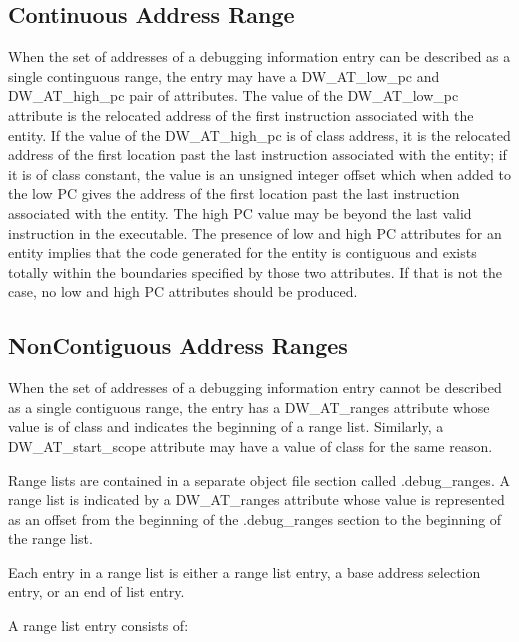 \subsection{Continuous Address Range}
\label{chap:contiguousaddressranges}
When the set of addresses of a debugging information entry can
be described as a single continguous range, the entry may have
a DW\-\_AT\-\_low\-\_pc and DW\-\_AT\-\_high\-\_pc pair of attributes. The value
of the DW\-\_AT\-\_low\-\_pc attribute is the relocated address of the
first instruction associated with the entity. If the value of
the DW\-\_AT\-\_high\-\_pc is of class address, it is the relocated
address of the first location past the last instruction
associated with the entity; if it is of class constant, the
value is an unsigned integer offset which when added to the
low PC gives the address of the first location past the last
instruction associated with the entity.  The high PC value
may be beyond the last valid instruction in the executable.
The presence of low and high PC attributes for an entity
implies that the code generated for the entity is contiguous
and exists totally within the boundaries specified by those
two attributes. If that is not the case, no low and high PC
attributes should be produced.

\subsection{Non\dash Contiguous Address Ranges}
\label{chap:noncontiguousaddressranges}
When the set of addresses of a debugging information entry
cannot be described as a single contiguous range, the entry has
a DW\-\_AT\-\_ranges attribute whose value is of class 
and indicates the beginning of a range list. Similarly,
a DW\-\_AT\-\_start\-\_scope attribute may have a value of class
 for the same reason.  

Range lists are contained
in a separate object file section called .debug\_ranges. A
range list is indicated by a DW\-\_AT\-\_ranges attribute whose
value is represented as an offset from the beginning of the
.debug\_ranges section to the beginning of the range list.

Each entry in a range list is either a range list entry,
a base address selection entry, or an end of list entry.

A range list entry consists of:

